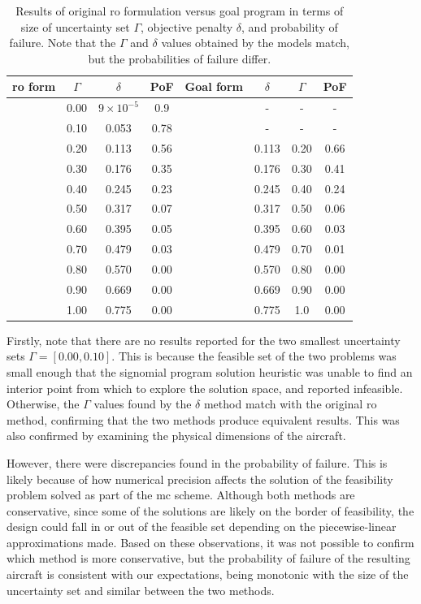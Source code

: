 \begin{table}
\begin{center}
\caption{\label{tab:deltaVsGamma} Results of original \gls{ro} formulation versus goal program in terms
of size of uncertainty set $\Gamma$, objective penalty $\delta$, and probability of failure. Note that the $\Gamma$
and $\delta$ values obtained by the models match, but the probabilities of failure differ. }
\begin{tabular}{c c c c c c c c}
\hline
 \gls{ro} form & $\Gamma$ & $\delta$ & PoF & Goal form & $\delta$ & $\Gamma$ & PoF \\
\hline
& 0.00 & $9 \times 10^{-5}$ & 0.9 & & - & - & - \\
& 0.10 & 0.053 & 0.78 & & - & - & - \\
& 0.20 & 0.113 & 0.56 & & 0.113 & 0.20 & 0.66 \\
& 0.30 & 0.176 & 0.35 & & 0.176 & 0.30 & 0.41 \\
& 0.40 & 0.245 & 0.23 & & 0.245 & 0.40 & 0.24 \\
& 0.50 & 0.317 & 0.07 & & 0.317 & 0.50 & 0.06 \\
& 0.60 & 0.395 & 0.05 & & 0.395 & 0.60 & 0.03 \\
& 0.70 & 0.479 & 0.03 & & 0.479 & 0.70 & 0.01 \\
& 0.80 & 0.570 & 0.00 & & 0.570 & 0.80 & 0.00 \\
& 0.90 & 0.669 & 0.00 & & 0.669 & 0.90 & 0.00 \\
& 1.00 & 0.775 & 0.00 & & 0.775 & 1.0 & 0.00 \\
\end{tabular}
\end{center}
\end{table}

Firstly, note that there are no results reported for the two smallest uncertainty sets $\Gamma = [0.00, 0.10]$.
This is because the feasible set of the two problems was small enough that the signomial program
solution heuristic was unable to find an interior point from which to explore the solution space, and
reported infeasible. Otherwise, the $\Gamma$ values found by the $\delta$ method match
with the original \gls{ro} method, confirming that the two methods produce equivalent results. This
was also confirmed by examining the physical dimensions of the aircraft.

However, there were discrepancies found in the probability of failure.
This is likely because of
how numerical precision affects the solution of the feasibility problem solved as part of the \gls{mc} scheme.
Although both methods are conservative, since some of the solutions are likely on the border of feasibility,
the design could fall in or out of the feasible set depending on the piecewise-linear
approximations made.
Based on these observations, it was not possible to confirm which method is more conservative,
but the probability of failure of the resulting aircraft is
consistent with our expectations,
being monotonic with the size of the uncertainty set and similar between the two methods.

